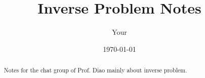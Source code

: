 \documentclass{article}
\title{Inverse Problem Notes}
\author{Your}
\date{\today}
\begin{document}
\maketitle

\begin{abstract}
    Notes for the chat group of Prof. Diao
    mainly about inverse problem.
    \cite{EMH}
\end{abstract}

\tableofcontents
\newpage


\end{document}
